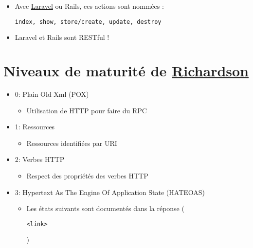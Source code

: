 \begin{itemize}
\tightlist
\item
  Avec
  \href{https://laravel.com/docs/master/controllers\#resource-controllers}{Laravel}
  ou Rails, ces actions sont nommées :
  \begin{otherlanguage}{english}\texttt{index,\ show,\ store/create,\ update,\ destroy}\end{otherlanguage}
\item
  Laravel et Rails sont RESTful !
\end{itemize}

\hypertarget{niveaux-de-maturituxe9-de-richardson18}{%
\section{\texorpdfstring{Niveaux de maturité de
\href{http://martinfowler.com/articles/richardsonMaturityModel.html}{Richardson}}{Niveaux de maturité de Richardson}}\label{niveaux-de-maturituxe9-de-richardson18}}

\begin{itemize}
\tightlist
\item
  0: Plain Old Xml (POX)

  \begin{itemize}
  \tightlist
  \item
    Utilisation de HTTP pour faire du RPC
  \end{itemize}
\item
  1: Ressources

  \begin{itemize}
  \tightlist
  \item
    Ressources identifiées par URI
  \end{itemize}
\item
  2: Verbes HTTP

  \begin{itemize}
  \tightlist
  \item
    Respect des propriétés des verbes HTTP
  \end{itemize}
\item
  3: Hypertext As The Engine Of Application State (HATEOAS)

  \begin{itemize}
  \tightlist
  \item
    Les états suivants sont documentés dans la réponse
    (\begin{otherlanguage}{english}\texttt{\textless{}link\textgreater{}}\end{otherlanguage})
  \end{itemize}
\end{itemize}

